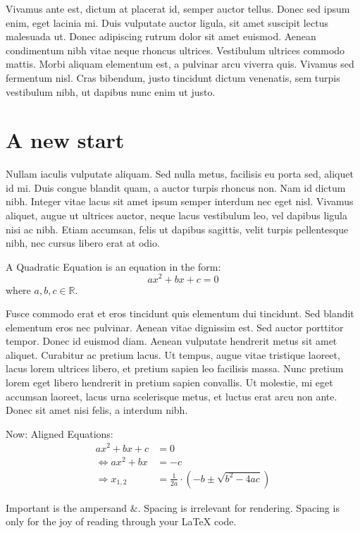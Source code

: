 \documentclass[11pt,a4paper,oneside]{report}
\begin{document}
Vivamus ante est, dictum at placerat id, semper auctor tellus. Donec 
sed ipsum enim, eget lacinia mi. Duis vulputate auctor ligula, sit 
amet suscipit lectus malesuada ut. Donec adipiscing rutrum dolor sit 
amet euismod. Aenean condimentum nibh vitae neque rhoncus ultrices. 
Vestibulum ultrices commodo mattis. Morbi aliquam elementum est, a 
pulvinar arcu viverra quis. Vivamus sed fermentum nisl. Cras 
bibendum, justo tincidunt dictum venenatis, sem turpis vestibulum 
nibh, ut dapibus nunc enim ut justo. 

\chapter{A new start}
Nullam iaculis vulputate 
aliquam. Sed nulla metus, facilisis eu porta sed, aliquet id mi. 
Duis congue blandit quam, a auctor turpis rhoncus non. Nam id dictum 
nibh. Integer vitae lacus sit amet ipsum semper interdum nec eget 
nisl. Vivamus aliquet, augue ut ultrices auctor, neque lacus 
vestibulum leo, vel dapibus ligula nisi ac nibh. Etiam accumsan, 
felis ut dapibus sagittis, velit turpis pellentesque nibh, nec cursus
libero erat at odio.

A Quadratic Equation is an equation in the form:
\begin{equation}
    ax^2+bx+c=0
\end{equation}
where \(a,b,c\in\mathbb{R}\).

Fusce commodo erat et eros tincidunt quis elementum dui tincidunt. 
Sed blandit elementum eros nec pulvinar. Aenean vitae dignissim est. 
Sed auctor porttitor tempor. Donec id euismod diam. Aenean vulputate 
hendrerit metus sit amet aliquet. Curabitur ac pretium lacus. Ut 
tempus, augue vitae tristique laoreet, lacus lorem ultrices libero, 
et pretium sapien leo facilisis massa. Nunc pretium lorem eget libero
hendrerit in pretium sapien convallis. Ut molestie, mi eget accumsan 
laoreet, lacus urna scelerisque metus, et luctus erat arcu non ante. 
Donec sit amet nisi felis, a interdum nibh.

Now: Aligned Equations:
\begin{align}
                    ax^2+bx+c &= 0\\
    \Leftrightarrow ax^2+bx   &= -c\\
    \Rightarrow x_{1,2} &= \frac{1}{2a} \cdot (-b \pm \sqrt{b^2 - 4ac})
\end{align}

Important is the ampersand \&. Spacing is irrelevant for rendering.
Spacing is only for the joy of reading through your \LaTeX{} code.
\end{document}
